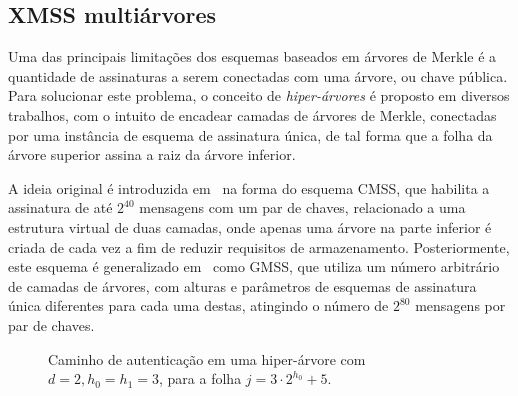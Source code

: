 \documentclass[12pt,notitlepage]{report}
\newcommand{\pk}{\mathcal{P}_k}
\begin{document}
\subsection{XMSS multiárvores}

Uma das principais limitações dos esquemas baseados em árvores de Merkle é a quantidade de assinaturas a serem conectadas com uma árvore, ou chave pública. Para solucionar este problema, o conceito de \emph{hiper-árvores} é proposto em diversos trabalhos, com o intuito de encadear camadas de árvores de Merkle, conectadas por uma instância de esquema de assinatura única, de tal forma que a folha da árvore superior assina a raiz da árvore inferior.

A ideia original é introduzida em~\cite{Buchmann:2006:CIM:2087445.2087479} na forma do esquema CMSS, que habilita a assinatura de até $2^{40}$ mensagens com um par de chaves, relacionado a uma estrutura virtual de duas camadas, onde apenas uma árvore na parte inferior é criada de cada vez a fim de reduzir requisitos de armazenamento. Posteriormente, este esquema é generalizado em~\cite{Buchmann:2007:MSV:1419765.1419769} como GMSS, que utiliza um número arbitrário de camadas de árvores, com alturas e parâmetros de esquemas de assinatura única diferentes para cada uma destas, atingindo o número de $2^{80}$ mensagens por par de chaves.

\begin{figure}
    \centering
    \caption{Caminho de autenticação em uma hiper-árvore com $d = 2, h_0 = h_1 = 3$, para a folha $j = 3 \cdot 2^{h_0} + 5$.}
    \label{fig:8}
\end{figure}
\end{document}
